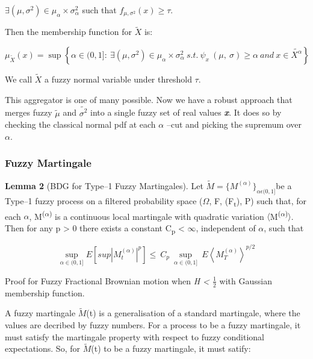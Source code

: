 \documentclass[12pt,a4paper]{report}
\numberwithin{equation}{section}
\begin{document}
\(\exists\left( \mu,\sigma^{2} \right) \in \mu_{\alpha} \times \sigma_{\alpha}^{2}\)
such that \(f_{\mu,\sigma^{2}}(x) \geq \tau\).

Then the membership function for \(\widetilde{X}\) is:

\[\mu_{\widetilde{X}}(x) = \sup\left\{ \alpha \in (0,1\rbrack:\ \exists\left( \mu,\sigma^{2} \right) \in \mu_{\alpha} \times \sigma_{\alpha}^{2}\ s.t.\ \psi_{x}\ (\mu,\ \sigma) \geq \alpha\ and\ x \in \widetilde{X^{\alpha}} \right\}\]

We call \(\widetilde{X}\) a fuzzy normal variable under threshold $\tau$.

This aggregator is one of many possible. Now we have a robust approach
that merges fuzzy \(\widetilde{\mu}\) and \(\widetilde{\sigma^{2}}\)
into a single fuzzy set of real values \emph{\textbf{x}}. It does so by
checking the classical normal pdf at each $\alpha$ --cut and picking the
supremum over $\alpha$.

\hypertarget{fuzzy--martingale}{%
\subsubsection{Fuzzy Martingale}\label{fuzzy--martingale}}

\textbf{Lemma 2} (BDG for Type--1 Fuzzy Martingales). Let
\(\widetilde{M} = {\{ M^{(\alpha)}\}}_{\alpha\epsilon(0,1\rbrack}\)be a
Type--1 fuzzy process on a filtered probability space ($\Omega$, F,
(F\textsubscript{t}), P) such that, for each $\alpha$, M\textsuperscript{($\alpha$)}
is a continuous local martingale with quadratic variation
$\langle$M\textsuperscript{($\alpha$)}$\rangle$. Then for any p \textgreater{} 0 there exists a
constant C\textsubscript{p} \textless{} $\infty$, independent of $\alpha$, such that

\[\sup_{\alpha \in (0,1\rbrack}{E\left\lbrack {sup|M_{t}^{(\alpha)}|}^{p} \right\rbrack} \leq \ C_{p}\ \sup_{\alpha \in (0,1\rbrack}{\ E\left\langle M_{T}^{(\alpha)} \right\rangle}^{p/2}\]

Proof for Fuzzy Fractional Brownian motion when \emph{H \textless{} $\frac{1}{2}$}
with Gaussian membership function.

A fuzzy martingale \(\widetilde{M}\)(t) is a generalisation of a
standard martingale, where the values are decribed by fuzzy numbers. For
a process to be a fuzzy martingale, it must satisfy the martingale
property with respect to fuzzy conditional expectations. So, for
\(\widetilde{M}\)(t) to be a fuzzy martingale, it must satify:
\end{document}
